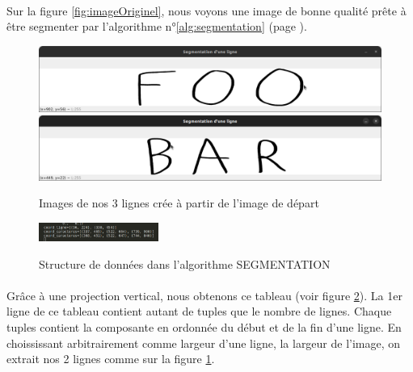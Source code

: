 \documentclass[a4paper]{article}
\begin{document}
			\paragraph{} Sur la figure \ref{fig:imageOriginel}, nous voyons une image de bonne qualité prête à être segmenter par l'algorithme n°\ref{alg:segmentation} (page \pageref{alg:segmentation}). 
			\begin{figure}
				\caption{Images de nos 3 lignes crée à partir de l'image de départ}
				\includegraphics[width=.8\textwidth]{segmentation_ligne1.png}
				\centering
				\includegraphics[width=.8\textwidth]{segmentation_ligne2.png}
				\centering
				\label{fig:imageLignes}
			\end{figure}
			\begin{figure}
					\caption{Structure de données dans l'algorithme SEGMENTATION}
					\includegraphics[width=0.35\textwidth]{structDonnee.png}
					\label{fig:structDonnee}
			\end{figure}
			\paragraph{} Grâce à une projection vertical, nous obtenons ce tableau (voir figure \ref{fig:structDonnee}). La 1er ligne de ce tableau contient autant de tuples que le nombre de lignes. Chaque tuples contient la composante en ordonnée du début et de la fin d'une ligne. En choississant arbitrairement comme largeur d'une ligne, la largeur de l'image, on extrait nos 2 lignes comme sur la figure \ref{fig:imageLignes}.
\end{document}
